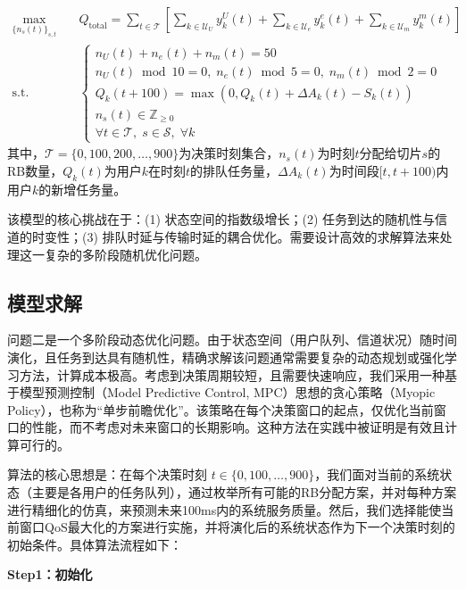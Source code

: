 \begin{equation}
\begin{aligned}
\max_{\{n_s(t)\}_{s,t}} \quad & Q_{\text{total}} = \sum_{t \in \mathcal{T}} \left[ \sum_{k \in \mathcal{U}_U} y_{k}^{U}(t) + \sum_{k \in \mathcal{U}_e} y_{k}^{e}(t) + \sum_{k \in \mathcal{U}_m} y_{k}^{m}(t) \right]\\
\text{s.t.} \quad & \begin{cases}
 n_U(t) + n_e(t) + n_m(t) = 50\\
 n_U(t) \bmod 10 = 0,\; n_e(t) \bmod 5 = 0,\; n_m(t) \bmod 2 = 0\\
 Q_k(t+100) = \max\!\left(0, Q_k(t) + \Delta A_k(t) - S_k(t)\right) \\
 n_s(t) \in \mathbb{Z}_{\ge 0}\\
 \forall t \in \mathcal{T},\;s \in \mathcal{S},\; \forall k
 \end{cases}
 \end{aligned}
 \end{equation}
其中，$\mathcal{T} = \{0, 100, 200, \ldots, 900\}$为决策时刻集合，$n_s(t)$为时刻$t$分配给切片$s$的RB数量，$Q_k(t)$为用户$k$在时刻$t$的排队任务量，$\Delta A_k(t)$为时间段$[t, t+100)$内用户$k$的新增任务量。

该模型的核心挑战在于：(1) 状态空间的指数级增长；(2) 任务到达的随机性与信道的时变性；(3) 排队时延与传输时延的耦合优化。需要设计高效的求解算法来处理这一复杂的多阶段随机优化问题。

\subsection{模型求解}

问题二是一个多阶段动态优化问题。由于状态空间（用户队列、信道状况）随时间演化，且任务到达具有随机性，精确求解该问题通常需要复杂的动态规划或强化学习方法，计算成本极高。考虑到决策周期较短，且需要快速响应，我们采用一种基于模型预测控制（Model Predictive Control, MPC）思想的贪心策略（Myopic Policy），也称为“单步前瞻优化”。该策略在每个决策窗口的起点，仅优化当前窗口的性能，而不考虑对未来窗口的长期影响。这种方法在实践中被证明是有效且计算可行的。

算法的核心思想是：在每个决策时刻 $t \in \{0, 100, \dots, 900\}$，我们面对当前的系统状态（主要是各用户的任务队列），通过枚举所有可能的RB分配方案，并对每种方案进行精细化的仿真，来预测未来100ms内的系统服务质量。然后，我们选择能使当前窗口QoS最大化的方案进行实施，并将演化后的系统状态作为下一个决策时刻的初始条件。具体算法流程如下：

\textbf{Step1：初始化}

